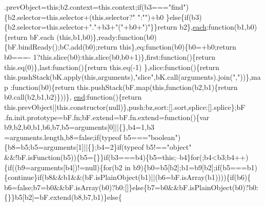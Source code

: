 \begin{DoxyCode}
      .prevObject=\textcolor{keyword}{this};b2.context=this.context;\textcolor{keywordflow}{if}(b3===\textcolor{stringliteral}{"find"})\{b2.selector=this.selector+(this.selector?\textcolor{stringliteral}{" "}:\textcolor{stringliteral}{""})+b0
      \}\textcolor{keywordflow}{else}\{\textcolor{keywordflow}{if}(b3)\{b2.selector=this.selector+\textcolor{stringliteral}{"."}+b3+\textcolor{stringliteral}{"("}+b0+\textcolor{stringliteral}{")"}\}\}\textcolor{keywordflow}{return} b2\},\hyperlink{docs_2_programmer's_manual_2html_2jquery_8js_a871ff39db627c54c710a3e9909b8234c}{each}:\textcolor{keyword}{function}(b1,b0)\{\textcolor{keywordflow}{return} bF.each
      (\textcolor{keyword}{this},b1,b0)\},ready:\textcolor{keyword}{function}(b0)\{bF.bindReady();bC.add(b0);\textcolor{keywordflow}{return} \textcolor{keyword}{this}\},eq:\textcolor{keyword}{function}(b0)\{b0=+b0;\textcolor{keywordflow}{return} b0===-
      1?this.slice(b0):this.slice(b0,b0+1)\},first:function()\{\textcolor{keywordflow}{return} this.eq(0)\},last:\textcolor{keyword}{function}()\{\textcolor{keywordflow}{return} this.eq(-1)
      \},slice:\textcolor{keyword}{function}()\{\textcolor{keywordflow}{return} this.pushStack(bK.apply(\textcolor{keyword}{this},arguments),\textcolor{stringliteral}{"slice"},bK.call(arguments).join(\textcolor{stringliteral}{","}))\},map
      :\textcolor{keyword}{function}(b0)\{\textcolor{keywordflow}{return} this.pushStack(bF.map(\textcolor{keyword}{this},\textcolor{keyword}{function}(b2,b1)\{return b0.call(b2,b1,b2)\}))\},
      \hyperlink{heap_8c_a57dfa4d169c6b9c0b4e7352bc0c34366}{end}:\textcolor{keyword}{function}()\{\textcolor{keywordflow}{return} this.prevObject||this.constructor(null)\},push:bz,sort:[].sort,splice:[].splice\};bF
      .fn.init.prototype=bF.fn;bF.extend=bF.fn.extend=\textcolor{keyword}{function}()\{var b9,b2,b0,b1,b6,b7,b5=arguments[0]||\{\},b4=1,b3
      =arguments.length,b8=\textcolor{keyword}{false};\textcolor{keywordflow}{if}(typeof b5===\textcolor{stringliteral}{"boolean"})\{b8=b5;b5=arguments[1]||\{\};b4=2\}\textcolor{keywordflow}{if}(typeof b5!==\textcolor{stringliteral}{"object"}
      &&!bF.isFunction(b5))\{b5=\{\}\}\textcolor{keywordflow}{if}(b3===b4)\{b5=\textcolor{keyword}{this};--b4\}\textcolor{keywordflow}{for}(;b4<b3;b4++)\{\textcolor{keywordflow}{if}((b9=arguments[b4])!=null)\{\textcolor{keywordflow}{for}(b2 in 
      b9)\{b0=b5[b2];b1=b9[b2];\textcolor{keywordflow}{if}(b5===b1)\{\textcolor{keywordflow}{continue}\}\textcolor{keywordflow}{if}(b8&&b1&&(bF.isPlainObject(b1)||(b6=bF.isArray(b1))))\{\textcolor{keywordflow}{if}(b6)\{
      b6=\textcolor{keyword}{false};b7=b0&&bF.isArray(b0)?b0:[]\}\textcolor{keywordflow}{else}\{b7=b0&&bF.isPlainObject(b0)?b0:\{\}\}b5[b2]=bF.extend(b8,b7,b1)\}\textcolor{keywordflow}{else}\{\textcolor{keywordflow}{
}
\end{DoxyCode}
